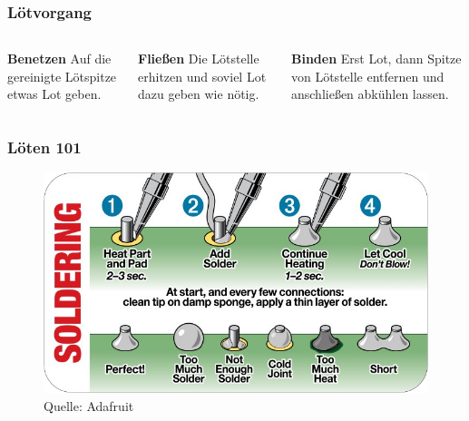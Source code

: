 \documentclass[10pt]{beamer}
\begin{document}
	\begin{frame}
	\frametitle{Lötvorgang}
	\begin{columns}[T] %
		\begin{column}{.33\textwidth}
			\textbf{Benetzen} \newline
			Auf die gereinigte Lötspitze etwas Lot geben.
		\end{column}%
		\hfill%
		\begin{column}{.33\textwidth}
			\textbf{Fließen} \newline
			Die Lötstelle erhitzen und soviel Lot dazu geben wie nötig.
		\end{column}%
		\begin{column}{.33\textwidth}
			\textbf{Binden} \newline
			Erst Lot, dann Spitze von Lötstelle entfernen und anschließen abkühlen lassen.
		\end{column}%
		\hfill%
	\end{columns}
	\end{frame}

	\begin{frame}
	\frametitle{Löten 101}
	\begin{figure}[hbtp]
		\centering
		\includegraphics[width=\linewidth]{images/solder.png}
		\caption{Quelle: Adafruit}
	\end{figure}
	\end{frame}
\end{document}
